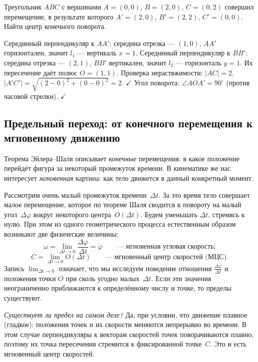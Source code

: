 \documentclass[../main.tex]{subfiles}
\begin{document}
\begin{example}
Треугольник $ABC$ с вершинами $A = (0, 0)$, $B = (2, 0)$, $C = (0, 2)$
совершил перемещение, в результате которого $A' = (2, 0)$, $B' = (2, 2)$,
$C' = (0, 0)$. Найти центр конечного поворота.

Серединный перпендикуляр к $AA'$: середина отрезка --- $(1, 0)$,
$AA'$ горизонтален, значит $l_1$ --- вертикаль $x = 1$.
Серединный перпендикуляр к $BB'$: середина отрезка --- $(2, 1)$,
$BB'$ вертикален, значит $l_2$ --- горизонталь $y = 1$.
Их пересечение даёт полюс $O = (1, 1)$.
Проверка нерастяжимости: $|AC| = 2$, $|A'C'| = \sqrt{(2-0)^2 + (0-0)^2} = 2$. $\checkmark$
Угол поворота: $\angle AOA' = 90^\circ$ (против часовой стрелки). $\checkmark$
\end{example}

\subsection{Предельный переход: от конечного перемещения к мгновенному движению}

Теорема Эйлера--Шаля описывает \textit{конечные} перемещения:
в какое положение перейдёт фигура за некоторый промежуток времени.
В кинематике же нас интересует \textit{мгновенная} картина:
как тело движется в данный конкретный момент.

Рассмотрим очень малый промежуток времени~$\Delta t$.
За это время тело совершает малое перемещение, которое по теореме Шаля
сводится к повороту на малый угол~$\Delta\varphi$ вокруг некоторого центра~$O(\Delta t)$.
Будем уменьшать $\Delta t$, стремясь к нулю.
При этом из одного геометрического процесса естественным образом возникают две физические величины:
\[
\omega = \lim_{\Delta t \to 0} \frac{\Delta\varphi}{\Delta t} = \dot\varphi
\qquad\text{--- мгновенная угловая скорость;}
\]
\[
C = \lim_{\Delta t \to 0} O(\Delta t)
\qquad\text{--- мгновенный центр скоростей (МЦС).}
\]
Запись $\lim_{\Delta t \to 0}$ означает, что мы исследуем поведение отношения
$\frac{\Delta\varphi}{\Delta t}$ и положения точки $O$ при сколь угодно малых~$\Delta t$.
Если эти значения неограниченно приближаются к определённому числу и точке,
то пределы существуют.

\noindent\textit{Существует ли предел на самом деле?}
Да, при условии, что движение плавное (гладкое): положения точек
и их скорости меняются непрерывно во времени. В этом случае
перпендикуляры к векторам скоростей точек поворачиваются плавно, поэтому их
точка пересечения стремится к фиксированной точке~$C$.
Это и есть мгновенный центр скоростей.
\end{document}
